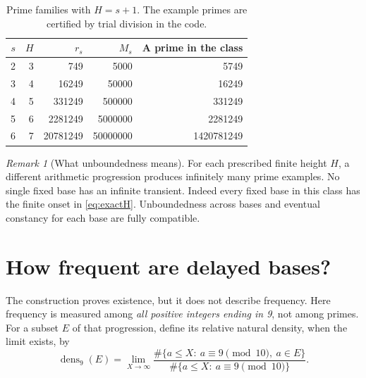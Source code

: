 \documentclass[11pt,letterpaper]{article}
\numberwithin{equation}{section}
\theoremstyle{definition}
\theoremstyle{remark}
\newtheorem{remark}[theorem]{Remark}
\begin{document}
\begin{table}[htbp]
\centering
\caption{Prime families with $H=s+1$. The example primes are certified by trial division in the code.}\label{tab:CRT}
\begin{tabular}{rrrrr}
\toprule
$s$&$H$&$r_s$&$M_s$&A prime in the class\\
\midrule
2&3&749&5000&5749\\
3&4&16249&50000&16249\\
4&5&331249&500000&331249\\
5&6&2281249&5000000&2281249\\
6&7&20781249&50000000&1420781249\\
\bottomrule
\end{tabular}
\end{table}

\begin{remark}[What unboundedness means]
For each prescribed finite height $H$, a different arithmetic progression produces infinitely many prime examples. No single fixed base has an infinite transient. Indeed every fixed base in this class has the finite onset in \eqref{eq:exactH}. Unboundedness across bases and eventual constancy for each base are fully compatible.
\end{remark}

\section{How frequent are delayed bases?}\label{sec:density}

The construction proves existence, but it does not describe frequency. Here frequency is measured among \emph{all positive integers ending in 9}, not among primes. For a subset $E$ of that progression, define its relative natural density, when the limit exists, by
\[
 \operatorname{dens}_9(E)=
 \lim_{X\to\infty}
 \frac{\#\{a\le X:\ a\equiv9\pmod{10},\ a\in E\}}
 {\#\{a\le X:\ a\equiv9\pmod{10}\}}.
\]
\end{document}
